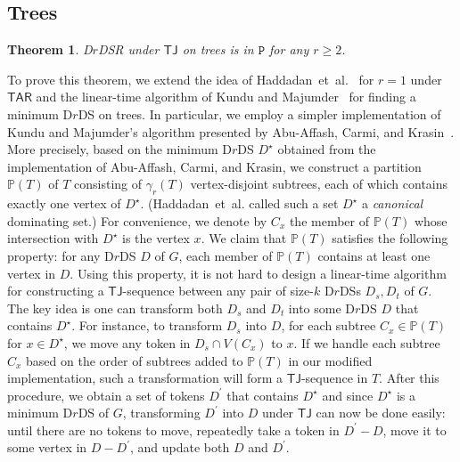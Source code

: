 \documentclass[a4paper]{article}
\theoremstyle{plain}
\newtheorem{theorem}{Theorem}
\theoremstyle{definition}
\newcommand{\sfTJ}{{\mathsf{TJ}}} %
\newcommand{\sfTAR}{{\mathsf{TAR}}} %
\newcommand{\ttP}{{\mathtt{P}}}
\begin{document}
\subsection{Trees}
\label{sec:trees}

\begin{theorem}\label{thm:TJ-trees}
	\textsc{D$r$DSR} under $\sfTJ$ on trees is in $\ttP$ for any $r \geq 2$.
\end{theorem}

To prove this theorem, we extend the idea of Haddadan~et~al.~\cite{HaddadanIMNOST16} for $r = 1$ under $\sfTAR$ and the linear-time algorithm of Kundu and Majumder~\cite{KunduM16} for finding a minimum D$r$DS on trees.
In particular, we employ a simpler implementation of Kundu and Majumder's algorithm presented by Abu-Affash, Carmi, and Krasin~\cite{Abu-AffashCK22}.
More precisely, based on the minimum D$r$DS $D^\star$ obtained from the implementation of Abu-Affash, Carmi, and Krasin, we construct a partition $\mathbb{P}(T)$ of $T$ consisting of $\gamma_r(T)$ vertex-disjoint subtrees, each of which contains exactly one vertex of $D^\star$.
(Haddadan~et~al. called such a set $D^\star$ a \textit{canonical} dominating set.)
For convenience, we denote by $C_x$ the member of $\mathbb{P}(T)$ whose intersection with $D^\star$ is the vertex $x$.
We claim that $\mathbb{P}(T)$ satisfies the following property: for any D$r$DS $D$ of $G$, each member of $\mathbb{P}(T)$ contains at least one vertex in $D$.
Using this property, it is not hard to design a linear-time algorithm for constructing a $\sfTJ$-sequence between any pair of size-$k$ D$r$DSs $D_s, D_t$ of $G$.
The key idea is one can transform both $D_s$ and $D_t$ into some D$r$DS $D$ that contains $D^\star$.
For instance, to transform $D_s$ into $D$, for each subtree $C_x \in \mathbb{P}(T)$ for $x \in D^\star$, we move any token in $D_s \cap V(C_x)$ to $x$.
If we handle each subtree $C_x$ based on the order of subtrees added to $\mathbb{P}(T)$ in our modified implementation, such a transformation will form a $\sfTJ$-sequence in $T$.
After this procedure, we obtain a set of tokens $D^\prime$ that contains $D^\star$ and since $D^\star$ is a minimum D$r$DS of $G$, transforming $D^\prime$ into $D$ under $\sfTJ$ can now be done easily: until there are no tokens to move, repeatedly take a token in $D^\prime - D$, move it to some vertex in $D - D^\prime$, and update both $D$ and $D^\prime$.
\end{document}
